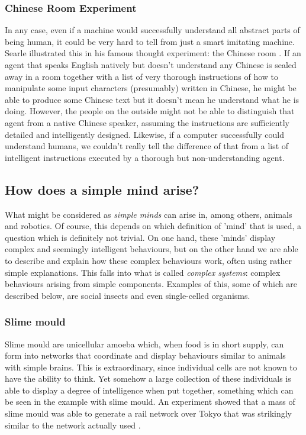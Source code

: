 \documentclass[11pt]{article}
\begin{document}
\subsubsection*{Chinese Room Experiment}
\label{sec:chinese_room}

In any case, even if a machine would successfully understand all abstract parts of being human, it could be very hard to tell from just a smart imitating machine. Searle illustrated this in his famous thought experiment: the Chinese room \cite{searle1980minds} . If an agent that speaks English natively but doesn't understand any Chinese is sealed away in a room together with a list of very thorough instructions of how to manipulate some input characters (presumably) written in Chinese, he might be able to produce some Chinese text but it doesn't mean he understand what he is doing. However, the people on the outside might not be able to distinguish that agent from a native Chinese speaker, assuming the instructions are sufficiently detailed and intelligently designed. Likewise, if a computer successfully could understand humans, we couldn't really tell the difference of that from a list of intelligent instructions executed by a thorough but non-understanding agent.

\subsection{How does a simple mind arise?}

What might be considered as \textit{simple minds} can arise in, among others, animals and robotics. Of course, this depends on which definition of 'mind' that is used, a question which is definitely not trivial. On one hand, these 'minds' display complex and seemingly intelligent behaviours, but on the other hand we are able to describe and explain how these complex behaviours work, often using rather simple explanations. This falls into what is called \textit{complex systems}: complex behaviours arising from simple components. Examples of this, some of which are described below, are social insects and even single-celled organisms.

\subsubsection*{Slime mould}

Slime mould are unicellular amoeba which, when food is in short supply, can form into networks that coordinate and display behaviours similar to animals with simple brains. This is extraordinary, since individual cells are not known to have the ability to think. Yet somehow a large collection of these individuals is able to display a degree of intelligence when put together, something which can be seen in the example with slime mould. An experiment showed that a mass of slime mould was able to generate a rail network over Tokyo that was strikingly similar to the network actually used \cite{tero2010rules}. 
\end{document}
